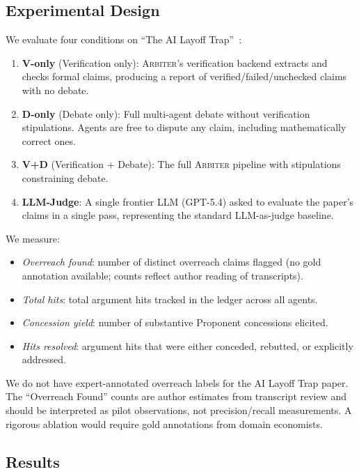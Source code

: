 \documentclass[11pt]{article}
\newcommand{\arbiter}{\textsc{Arbiter}}
\begin{document}
\subsection{Experimental Design}

We evaluate four conditions on ``The AI Layoff Trap''~\cite{falk2026}:

\begin{enumerate}[leftmargin=*,itemsep=2pt]
\item \textbf{V-only} (Verification only): \arbiter{}'s verification backend extracts and checks formal claims, producing a report of verified/failed/unchecked claims with no debate.
\item \textbf{D-only} (Debate only): Full multi-agent debate without verification stipulations. Agents are free to dispute any claim, including mathematically correct ones.
\item \textbf{V+D} (Verification + Debate): The full \arbiter{} pipeline with stipulations constraining debate.
\item \textbf{LLM-Judge}: A single frontier LLM (GPT-5.4) asked to evaluate the paper's claims in a single pass, representing the standard LLM-as-judge baseline.
\end{enumerate}

\noindent We measure:
\begin{itemize}[leftmargin=*,itemsep=1pt]
\item \emph{Overreach found}: number of distinct overreach claims flagged (no gold annotation available; counts reflect author reading of transcripts).
\item \emph{Total hits}: total argument hits tracked in the ledger across all agents.
\item \emph{Concession yield}: number of substantive Proponent concessions elicited.
\item \emph{Hits resolved}: argument hits that were either conceded, rebutted, or explicitly addressed.
\end{itemize}

\noindent We do not have expert-annotated overreach labels for the AI Layoff Trap paper. The ``Overreach Found'' counts are author estimates from transcript review and should be interpreted as pilot observations, not precision/recall measurements. A rigorous ablation would require gold annotations from domain economists.

\subsection{Results}
\end{document}
